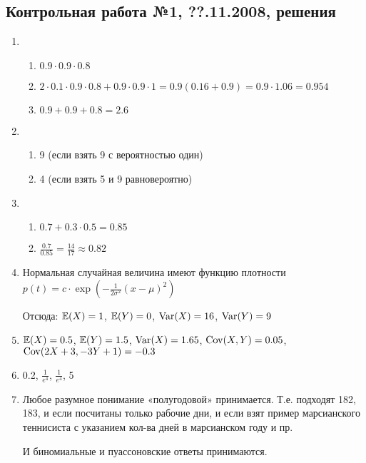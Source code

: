 


\subsection{Контрольная работа №1, ??.11.2008, решения}

\begin{enumerate}
\item
\begin{enumerate}
\item $0.9\cdot 0.9\cdot 0.8$
\item $2\cdot 0.1\cdot 0.9\cdot 0.8+0.9\cdot 0.9\cdot 1=0.9(0.16+0.9)=0.9\cdot 1.06=0.954$
\item $0.9+0.9+0.8=2.6$
\end{enumerate}
\item
\begin{enumerate}
\item 9 (если взять 9 с вероятностью один)
\item 4 (если взять 5 и 9 равновероятно)
\end{enumerate}
\item
\begin{enumerate}
\item $0.7+0.3\cdot0.5=0.85$
\item $\frac{0.7}{0.85}=\frac{14}{17}\approx 0.82$
\end{enumerate}
\item Нормальная случайная величина имеют функцию плотности $p(t)=c\cdot \exp(-\frac{1}{2\sigma^{2}}(x-\mu)^{2})$

Отсюда: $\mathbb{E}(X)=1$, $\mathbb{E}(Y)=0$, $\operatorname{Var}(X)=16$, $\operatorname{Var}(Y)=9$
\item $\mathbb{E}(X)=0.5$, $\mathbb{E}(Y)=1.5$, $\operatorname{Var}(X)=1.65$, $\operatorname{Cov}(X,Y)=0.05$, $\operatorname{Cov}(2X+3,-3Y+1)=-0.3$
\item 0.2, $\frac{1}{e^4}$, $\frac{1}{e^4}$, 5
\item Любое разумное понимание «полугодовой» принимается. Т.е. подходят 182, 183, и если посчитаны только рабочие дни, и если взят пример марсианского теннисиста с указанием кол-ва дней в марсианском году и пр.

И биномиальные и пуассоновские ответы принимаются.


\end{enumerate}
